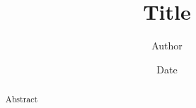 \documentclass{article}
\begin{document}
\title{Title}
\author{Author}
\date{Date}
\maketitle

\begin{abstract}
Abstract
\end{abstract}
\end{document}
